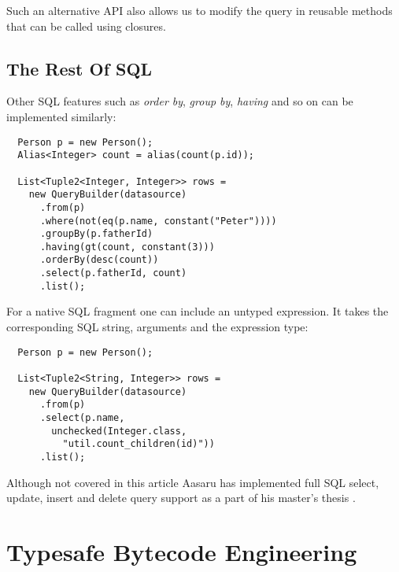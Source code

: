 \documentclass{sig-alternate}
\begin{document}
Such an alternative API also allows us to modify the query in reusable methods that can be called using closures.

\subsection{The Rest Of SQL}

Other SQL features such as \emph{order by}, \emph{group by}, \emph{having} and so on can be implemented similarly:

\begin{verbatim}
  Person p = new Person();
  Alias<Integer> count = alias(count(p.id));

  List<Tuple2<Integer, Integer>> rows =
    new QueryBuilder(datasource)
      .from(p)
      .where(not(eq(p.name, constant("Peter"))))
      .groupBy(p.fatherId)
      .having(gt(count, constant(3)))
      .orderBy(desc(count))
      .select(p.fatherId, count)
      .list();
\end{verbatim}

For a native SQL fragment one can include an untyped expression. It takes the corresponding SQL string, arguments and the expression type:

\begin{verbatim}
  Person p = new Person();

  List<Tuple2<String, Integer>> rows =
    new QueryBuilder(datasource)
      .from(p)
      .select(p.name,
        unchecked(Integer.class,
          "util.count_children(id)"))
      .list();
\end{verbatim}

Although not covered in this article Aasaru has implemented full SQL select, update, insert  and delete query support as a part of his master's thesis \cite{aasaru2008}.

\section{Typesafe Bytecode Engineering}
\end{document}
